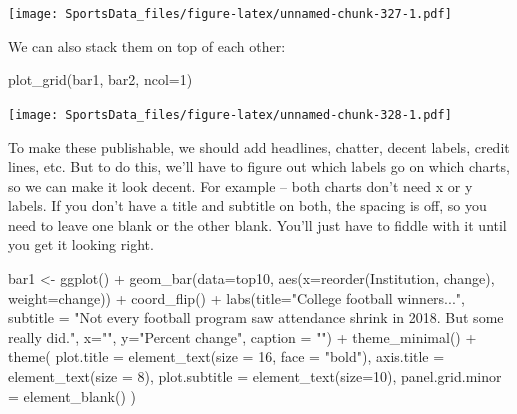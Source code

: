 \documentclass[
]{book}
\newenvironment{Shaded}{\begin{snugshade}}{\end{snugshade}}
\newcommand{\AttributeTok}[1]{\textcolor[rgb]{0.77,0.63,0.00}{#1}}
\newcommand{\DecValTok}[1]{\textcolor[rgb]{0.00,0.00,0.81}{#1}}
\newcommand{\FunctionTok}[1]{\textcolor[rgb]{0.00,0.00,0.00}{#1}}
\newcommand{\NormalTok}[1]{#1}
\newcommand{\OtherTok}[1]{\textcolor[rgb]{0.56,0.35,0.01}{#1}}
\newcommand{\SpecialCharTok}[1]{\textcolor[rgb]{0.00,0.00,0.00}{#1}}
\newcommand{\StringTok}[1]{\textcolor[rgb]{0.31,0.60,0.02}{#1}}
\begin{document}
\texttt{[image: SportsData\_files/figure-latex/unnamed-chunk-327-1.pdf]}

We can also stack them on top of each other:

\begin{Shaded}
\begin{Highlighting}[]
\FunctionTok{plot\_grid}\NormalTok{(bar1, bar2, }\AttributeTok{ncol=}\DecValTok{1}\NormalTok{) }
\end{Highlighting}
\end{Shaded}

\texttt{[image: SportsData\_files/figure-latex/unnamed-chunk-328-1.pdf]}

To make these publishable, we should add headlines, chatter, decent labels, credit lines, etc. But to do this, we'll have to figure out which labels go on which charts, so we can make it look decent. For example -- both charts don't need x or y labels. If you don't have a title and subtitle on both, the spacing is off, so you need to leave one blank or the other blank. You'll just have to fiddle with it until you get it looking right.

\begin{Shaded}
\begin{Highlighting}[]
\NormalTok{bar1 }\OtherTok{\textless{}{-}} \FunctionTok{ggplot}\NormalTok{() }\SpecialCharTok{+} \FunctionTok{geom\_bar}\NormalTok{(}\AttributeTok{data=}\NormalTok{top10, }\FunctionTok{aes}\NormalTok{(}\AttributeTok{x=}\FunctionTok{reorder}\NormalTok{(Institution, change), }\AttributeTok{weight=}\NormalTok{change)) }\SpecialCharTok{+} \FunctionTok{coord\_flip}\NormalTok{() }\SpecialCharTok{+} \FunctionTok{labs}\NormalTok{(}\AttributeTok{title=}\StringTok{"College football winners..."}\NormalTok{, }\AttributeTok{subtitle =} \StringTok{"Not every football program saw attendance shrink in 2018. But some really did."}\NormalTok{,  }\AttributeTok{x=}\StringTok{""}\NormalTok{, }\AttributeTok{y=}\StringTok{"Percent change"}\NormalTok{, }\AttributeTok{caption =} \StringTok{""}\NormalTok{) }\SpecialCharTok{+} \FunctionTok{theme\_minimal}\NormalTok{() }\SpecialCharTok{+} 
  \FunctionTok{theme}\NormalTok{(}
    \AttributeTok{plot.title =} \FunctionTok{element\_text}\NormalTok{(}\AttributeTok{size =} \DecValTok{16}\NormalTok{, }\AttributeTok{face =} \StringTok{"bold"}\NormalTok{),}
    \AttributeTok{axis.title =} \FunctionTok{element\_text}\NormalTok{(}\AttributeTok{size =} \DecValTok{8}\NormalTok{), }
    \AttributeTok{plot.subtitle =} \FunctionTok{element\_text}\NormalTok{(}\AttributeTok{size=}\DecValTok{10}\NormalTok{), }
    \AttributeTok{panel.grid.minor =} \FunctionTok{element\_blank}\NormalTok{()}
\NormalTok{    )}
\end{Highlighting}
\end{Shaded}
\end{document}
